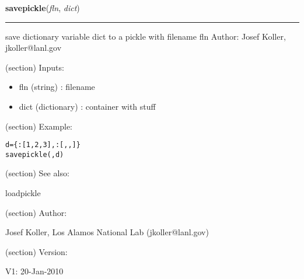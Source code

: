 \hspace{.8\funcindent}\begin{boxedminipage}{\funcwidth}

    \raggedright \textbf{savepickle}(\textit{fln}, \textit{dict})

    \vspace{-1.5ex}

    \rule{\textwidth}{0.5\fboxrule}
\setlength{\parskip}{2ex}
    save dictionary variable dict to a pickle with filename fln Author: 
    Josef Koller, jkoller@lanl.gov

    (section) Inputs:

      \begin{itemize}
      \setlength{\parskip}{0.6ex}
        \item fln (string) : filename

        \item dict (dictionary) : container with stuff

      \end{itemize}

    (section) Example:

\begin{alltt}
\pysrcprompt{{\textgreater}{\textgreater}{\textgreater} }d = \{:[1,2,3], :[, , ]\}
\pysrcprompt{{\textgreater}{\textgreater}{\textgreater} }savepickle(, d)\end{alltt}
    (section) See also:

      loadpickle

    (section) Author:

      Josef Koller, Los Alamos National Lab (jkoller@lanl.gov)

    (section) Version:

      V1: 20-Jan-2010

\setlength{\parskip}{1ex}
    \end{boxedminipage}

    \label{spacepy:toolbox:assemble}

    \vspace{0.5ex}

